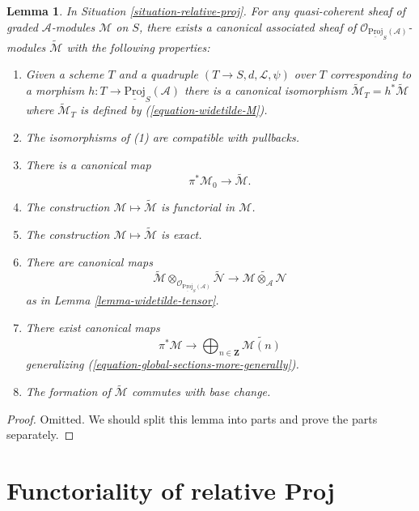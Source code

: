 \documentclass{stacks-project}
\theoremstyle{plain}
\newtheorem{lemma}[subsection]{Lemma}
\theoremstyle{definition}
\theoremstyle{remark}
\numberwithin{equation}{subsection}
\begin{document}
\begin{lemma}
\label{lemma-relative-proj-modules}
In Situation \ref{situation-relative-proj}.
For any quasi-coherent sheaf of graded $\mathcal{A}$-modules
$\mathcal{M}$ on $S$, there exists a canonical associated sheaf
of $\mathcal{O}_{\underline{\text{Proj}}_S(\mathcal{A})}$-modules
$\widetilde{\mathcal{M}}$ with the following properties:
\begin{enumerate}
\item Given a scheme $T$ and a quadruple
$(T \to S, d, \mathcal{L}, \psi)$ over $T$
corresponding to a morphism
$h : T \to \underline{\text{Proj}}_S(\mathcal{A})$ there is
a canonical isomorphism
$\widetilde{\mathcal{M}}_T = h^*\widetilde{\mathcal{M}}$
where $\widetilde{\mathcal{M}}_T$ is defined by (\ref{equation-widetilde-M}).
\item The isomorphisms of (1) are compatible with pullbacks.
\item There is a canonical map
$$
\pi^*\mathcal{M}_0 \longrightarrow \widetilde{\mathcal{M}}.
$$
\item The construction $\mathcal{M} \mapsto \widetilde{\mathcal{M}}$
is functorial in $\mathcal{M}$.
\item The construction $\mathcal{M} \mapsto \widetilde{\mathcal{M}}$
is exact.
\item There are canonical maps
$$
\widetilde{\mathcal{M}}
\otimes_{\mathcal{O}_{\underline{\text{Proj}}_S(\mathcal{A})}}
\widetilde{\mathcal{N}}
\longrightarrow
\widetilde{\mathcal{M} \otimes_\mathcal{A} \mathcal{N}}
$$
as in
Lemma \ref{lemma-widetilde-tensor}.
\item There exist canonical maps
$$
\pi^*\mathcal{M}
\longrightarrow
\bigoplus\nolimits_{n \in \mathbf{Z}}
\widetilde{\mathcal{M}(n)}
$$
generalizing (\ref{equation-global-sections-more-generally}).
\item The formation of $\widetilde{\mathcal{M}}$ commutes with base change.
\end{enumerate}
\end{lemma}

\begin{proof}
Omitted. We should split this lemma into parts and prove the parts separately.
\end{proof}












\section{Functoriality of relative Proj}
\label{section-functoriality-relative-proj}
\end{document}
